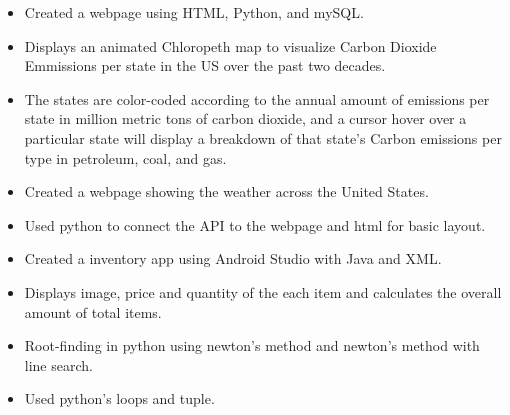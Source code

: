 \documentclass[10pt,a4paper,sans]{moderncv} %
\begin{document}
{}
\begin{itemize}
\vspace{-5mm}
\item{Created a webpage using HTML, Python, and mySQL.}
\item{Displays an animated Chloropeth map to visualize Carbon Dioxide Emmissions per state in the US over the past two decades.}
\item{The states are color-coded according to the annual amount of emissions per state in million metric tons of carbon dioxide, and a cursor hover over a particular state will display a breakdown of that state's Carbon emissions per type in petroleum, coal, and gas.}
\end{itemize}
\begin{itemize}
\vspace{-5mm}
\item{Created a webpage showing the weather across the United States.}
\item{Used python to connect the API to the webpage and html for basic layout.}
\end{itemize}
{}
\begin{itemize}
\vspace{-5mm}
\item{Created a inventory app using Android Studio with Java and XML.}
\item{Displays image, price and quantity of the each item and calculates the overall amount of total items.}
\end{itemize}
\begin{itemize}
\vspace{-5mm}
\item{Root-finding in python using newton's method and newton's method with line search.}
\item{Used python's loops and tuple.}
\end{itemize}
\end{document}
